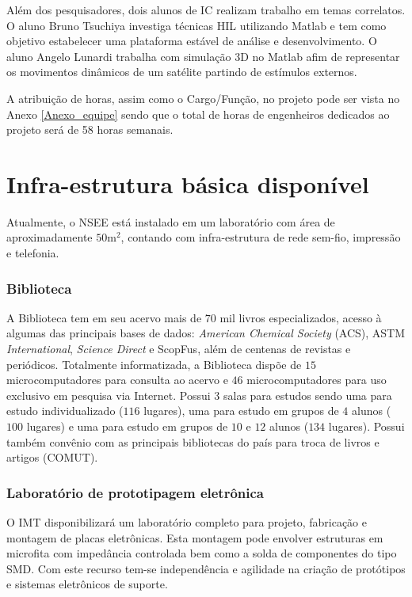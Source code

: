Além dos pesquisadores, dois alunos de IC realizam trabalho em temas correlatos. O aluno Bruno Tsuchiya investiga técnicas HIL utilizando Matlab e tem como objetivo estabelecer uma plataforma estável de análise e desenvolvimento. O aluno Angelo Lunardi trabalha com simulação 3D no Matlab afim de representar os movimentos dinâmicos de um satélite partindo de estímulos externos.
 
A atribuição de horas, assim como o Cargo/Função, no projeto pode ser vista no Anexo \ref{Anexo_equipe} sendo que o total de horas de engenheiros dedicados ao projeto será de 58 horas semanais.


\section{Infra-estrutura básica disponível}


Atualmente, o NSEE está instalado em um laboratório com área de aproximadamente $ 50\textrm{m}^2$, contando com infra-estrutura de rede sem-fio, impressão e telefonia.  

\subsubsection{Biblioteca}
A Biblioteca tem em seu acervo mais de $70$ mil livros especializados, acesso à  algumas das principais bases de dados: \textit{American Chemical Society} (ACS), ASTM \textit{International}, \textit{Science Direct} e ScopFus, além de centenas de revistas e periódicos. Totalmente informatizada, a Biblioteca dispõe de $15$ microcomputadores para consulta ao acervo e $46$ microcomputadores para uso exclusivo em pesquisa via Internet. Possui $3$ salas para estudos sendo uma para estudo individualizado ($116$ lugares), uma para estudo em grupos de $4$ alunos ($100$ lugares) e uma para estudo em grupos de $10$ e $12$ alunos ($134$ lugares). Possui também convênio com as principais bibliotecas do país para troca de livros e artigos (COMUT).

\subsubsection{Laboratório de prototipagem eletrônica}

O IMT disponibilizará um laboratório completo para projeto, fabricação e montagem de placas eletrônicas.  Esta montagem pode envolver estruturas em microfita com impedância controlada bem como a solda de componentes do tipo SMD. Com este recurso tem-se independência e agilidade na criação de protótipos e sistemas eletrônicos de suporte.

